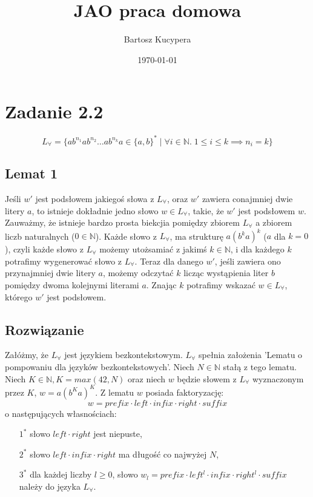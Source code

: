 \documentclass{article}
\title{JAO praca domowa}
\author{Bartosz Kucypera}
\date{\today}
\begin{document}
\maketitle

\section*{Zadanie 2.2} 

$$ L_{\forall} = \{ab^{n_1}ab^{n_2} \dots ab^{n_{k}}a \in \{a, b\}^* \; | \; \forall i \in \mathbb{N}.\; 1 \le i \le k \implies n_i = k\}$$

\subsection*{Lemat 1}
Jeśli $w'$ jest podsłowem jakiegoś słowa z $L_{\forall}$, oraz $w'$ zawiera conajmniej dwie litery $a$, to istnieje dokładnie jedno słowo $w \in L_{\forall}$, takie, że $w'$ jest podsłowem $w$. \newline \newline
Zauważmy, że istnieje bardzo prosta biekcjia pomiędzy zbiorem $L_{\forall}$ a zbiorem liczb naturalnych ($0 \in \mathbb{N}$).
Każde słowo z $L_{\forall}$, ma strukturę $a(b^ka)^k$ ($a$ dla $k=0$), czyli każde słowo z $L_{\forall}$ możemy utożsamiać z jakimś $k \in \mathbb{N}$, i dla każdego $k$ potrafimy wygenerować słowo z $L_{\forall}$. Teraz dla danego $w'$, jeśli zawiera ono przynajmniej dwie litery $a$, możemy odczytać $k$ licząc wystąpienia liter $b$ pomiędzy dwoma kolejnymi literami $a$. Znając $k$ potrafimy wskazać $w \in L_{\forall}$, którego $w'$ jest podsłowem.

\subsection*{Rozwiązanie}
Załóżmy, że $L_{\forall}$ jest językiem bezkontekstowym. \newline 
$L_{\forall}$ spełnia założenia 'Lematu o pompowaniu dla języków bezkontekstowych'. \newline 
Niech $N \in \mathbb{N}$ stałą z tego lematu. \newline
Niech $K \in \mathbb{N}, K=max(42, N)$ oraz niech $w$ będzie słowem z $L_{\forall}$ wyznaczonym przez $K$, $w=a(b^Ka)^K$.\newline 
Z lematu $w$ posiada faktoryzację: 
$$w = prefix  \cdot left \cdot infix \cdot right \cdot suffix$$
o następujących własnościach:

\begin{itemize}
	\item[$1^*$] słowo $left \cdot right$ jest niepuste,
	\item[$2^*$] słowo $left \cdot infix \cdot right$ ma długość co najwyżej $N$,
	\item[$3^*$] dla każdej liczby $l \ge 0$, słowo $w_l = prefix \cdot left^l \cdot infix \cdot right^l \cdot suffix$ należy do języka $L_{\forall}$.
\end{itemize}
\end{document}
